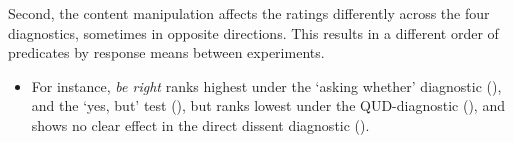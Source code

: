 \documentclass[12pt]{article}
\begin{document}
%
%
%

    Second, the content manipulation affects the ratings differently across the four diagnostics, sometimes in opposite directions. This results in a different order of predicates by response means between experiments.
    \begin{itemize}
      \item For instance, \emph{be right} ranks highest under the `asking whether' diagnostic (), and the `yes, but' test (), but ranks lowest under the QUD-diagnostic (), and shows no clear effect in the direct dissent diagnostic ().
    \end{itemize}
    
\end{document}

